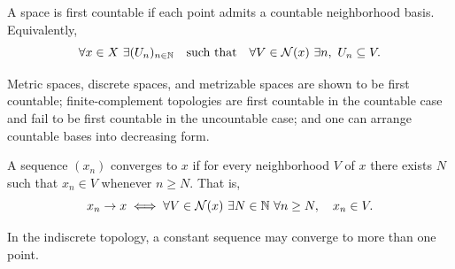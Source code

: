 \begin{definition}\label{def:first-countable-2-12}
\leanok
A space is first countable if each point admits a countable neighborhood basis.
Equivalently,
\[
\forall x\in X\ \exists (U_n)_{n\in\mathbb{N}}
\quad \text{such that} \quad
\forall V\in\mathcal N(x)\ \exists n,\ U_n\subseteq V.
\]
\end{definition}

\begin{proposition}\label{prop:first-countable-results-2-13-2-15}
\leanok
Metric spaces, discrete spaces, and metrizable spaces are shown to be first countable; finite-complement topologies are first countable in the countable case and fail to be first countable in the uncountable case; and one can arrange countable bases into decreasing form.
\end{proposition}

\begin{definition}\label{def:tendsto-seq-2-16}
\leanok
A sequence $(x_n)$ converges to $x$ if for every neighborhood $V$ of $x$ there exists $N$ such that $x_n\in V$ whenever $n\ge N$.
That is,
\[
x_n \to x
\iff
\forall V\in\mathcal N(x)\ \exists N\in\mathbb{N}\ \forall n\ge N,
\quad x_n\in V.
\]
\end{definition}

\begin{remark}\label{rem:indiscrete-limit-2-17}
\leanok
In the indiscrete topology, a constant sequence may converge to more than one point.
\end{remark}

